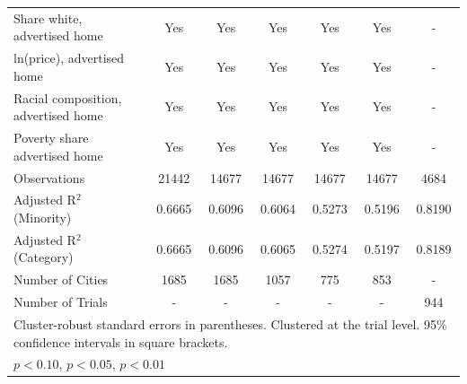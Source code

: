 \begin{table}[htbp]
{\begin{tabular}{l*{6}{c}}
\midrule
Share white, advertised home  & Yes & Yes & Yes & Yes & Yes & - \\
ln(price), advertised home  & Yes & Yes & Yes & Yes & Yes & - \\
Racial composition, advertised home & Yes & Yes & Yes & Yes & Yes & - \\
Poverty share advertised home & Yes & Yes & Yes & Yes & Yes & - \\
Observations & 21442 & 14677 & 14677 & 14677 & 14677 & 4684 \\
Adjusted R$^2$ (Minority) & 0.6665 & 0.6096 & 0.6064 & 0.5273 & 0.5196 & 0.8190 \\
Adjusted R$^2$ (Category) & 0.6665 & 0.6096 & 0.6065 & 0.5274 & 0.5197 & 0.8189 \\
Number of Cities & 1685 & 1685 & 1057 & 775 & 853 & - \\
Number of Trials & - & - & - & - & - & 944 \\
\bottomrule
\multicolumn{7}{l}{\footnotesize Cluster-robust standard errors in parentheses. Clustered at the trial level. 95\% confidence intervals in square brackets.}\\
\multicolumn{7}{l}{\footnotesize \sym{*} \(p<0.10\), \sym{**} \(p<0.05\), \sym{***} \(p<0.01\)}\\
\end{tabular}
}
\end{table}
